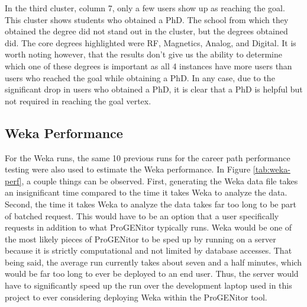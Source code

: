 In the third cluster, column 7, only a few users show up as reaching the goal. 
This cluster shows students who obtained a PhD.  The school from which they
obtained the degree did not stand out in the cluster, but the degrees obtained
did.  The core degrees highlighted were RF, Magnetics, Analog, and Digital.  It
is worth noting however, that the results don't give us the ability to determine
which one of these degrees is important as all 4 instances have more users than
users who reached the goal while obtaining a PhD.  In any case, due to the
significant drop in users who obtained a PhD, it is clear that a PhD is helpful
but not required in reaching the goal vertex.

\subsection{Weka Performance}
For the Weka runs, the same 10 previous runs for the career path performance
testing were also used to estimate the Weka performance.  In Figure
\ref{tab:weka-perf}, a couple things can be observed.  First, generating the
Weka data file takes an insignificant time compared to the time it takes Weka to
analyze the data.  Second, the time it takes Weka to analyze the data takes far
too long to be part of batched request.  This would have to be an option that a
user specifically requests in addition to what ProGENitor typically runs.  Weka
would be one of the most likely pieces of ProGENitor to be sped up by running on
a server because it is strictly computational and not limited by database
accesses.  That being said, the average run currently takes about seven and a
half minutes, which would be far too long to ever be deployed to an end user. 
Thus, the server would have to significantly speed up the run over the
development laptop used in this project to ever considering deploying Weka
within the ProGENitor tool.

